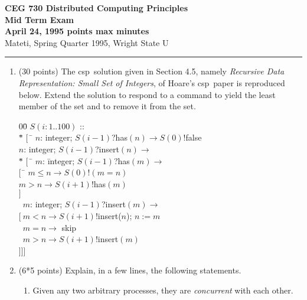 \def\fat{\framebox[1mm]{\rule{0mm}{2mm}}}
\def\rar{\rightarrow}
\def\pr{$\parallel$}
\def\CSP{{\sc csp}}
\def\RPC{{\sc rpc}}
\parindent=0pt



{\bf CEG 730 Distributed Computing Principles\\[5pt]
\large Mid Term Exam\\[10pt]
April 24, 1995  points max  minutes\\
}
\bigskip
{Mateti,  Spring Quarter 1995, Wright State U}\\[-5pt]
\hrule

\begin{enumerate}

\item (30 points)
The \CSP\ solution given in Section 4.5, namely {\sl Recursive Data
Representation: Small Set of Integers}, of Hoare's \CSP\ paper is
reproduced below.  Extend the solution to respond to a command to
yield the least member of the set and to remove it from the set.

\begin{tabbing}
00\=\kill
$S(i: 1 .. 100)$ ::\+\\
$ *$\= $[\ $ \= $n$: integer; $S(i-1)$?has$(n) \rar S(0)$!false\+\\
 \fat\> $n$: integer; $S(i-1)$?insert$(n) \rar$\+\\
     $*$\= $[\ $ \= $m$: \= integer; $S(i-1)$?has$(m) \rar$\+\+\\
       $[$\ \= $m \leq n \rar S(0)!(m = n)$\\
       \fat \> $m > n \rar S(i+1)$!has$(m)$\\
       $]$ \-\-\\
  \> \fat\ $m$: integer; $S(i-1)$?insert$(m) \rar$\+\+\\
    $[\  m < n \rar S(i+1)$!insert($n$); $n := m$\\
    \fat\ $m = n \rar $ skip\\
    \fat\ $m > n \rar S(i+1)$!insert$(m)$\-\-\-\\
]\>\>]\>]\\
\end{tabbing}

\item (6*5 points)
Explain, in a few lines, the following statements.

\begin{enumerate}


\item
Given any two arbitrary processes, they are {\em concurrent}
with each other.


\end{enumerate}
\end{enumerate}
